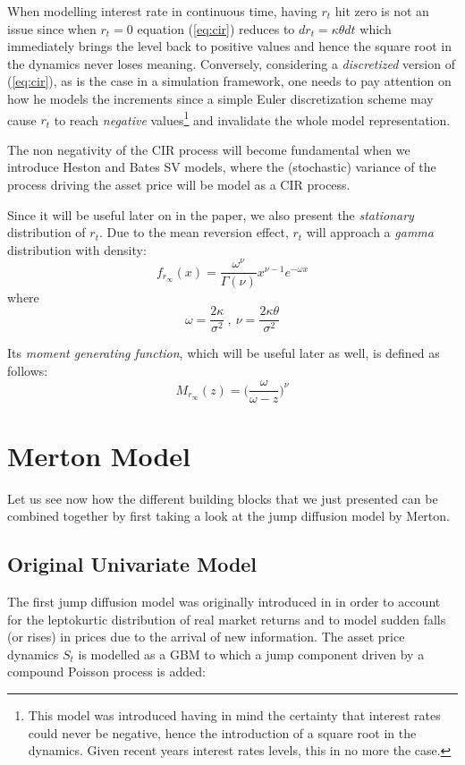 When modelling interest rate in continuous time, having $r_t$ hit zero is not an issue since when $r_t=0$ equation (\ref{eq:cir}) reduces to $dr_t = \kappa\theta dt$ which immediately brings the level back to positive values and hence the square root in the dynamics never loses meaning. Conversely, considering a \textit{discretized} version of (\ref{eq:cir}), as is the case in a simulation framework, one needs to pay attention on how he models the increments since a simple Euler discretization scheme may cause $r_t$ to reach \textit{negative} values\footnote{This model was introduced having in mind the certainty that interest rates could never be negative, hence the introduction of a square root in the dynamics. Given recent years interest rates levels, this in no more the case.} and invalidate the whole model representation.

The non negativity of the CIR process will become fundamental when we introduce Heston and Bates SV models, where the (stochastic) variance of the process driving the asset price will be model as a CIR process.

Since it will be useful later on in the paper, we also present the \textit{stationary} distribution of $r_t$. Due to the mean reversion effect, $r_t$ will approach a \textit{gamma} distribution with density:
\begin{equation}
\label{eq:cir_pdf}
f_{r_\infty}(x) = \frac{\omega^\nu}{\Gamma(\nu)} x^{\nu-1}e^{-\omega x}
\end{equation}
where
\begin{equation*}
\omega= \frac{2\kappa}{\sigma^2}\: , \: \nu= \frac{2\kappa\theta}{\sigma^2}
\end{equation*}

Its \textit{moment generating function}, which will be useful later as well, is defined as follows:
\begin{equation}
\label{eq:cir_mgf}
	M_{r_\infty}(z) = \Big(\frac{\omega}{\omega-z}\Big)^\nu
\end{equation}

\bigskip
\section{Merton Model}
\label{sec:merton}
Let us see now how the different building blocks that we just presented can be combined together by first taking a look at the jump diffusion model by Merton.

\subsection{Original Univariate Model}
The first jump diffusion model was originally introduced in \citep{MERTON1976} in order to account for the leptokurtic distribution of real market returns and to model sudden falls (or rises) in prices due to the arrival of new information.
The asset price dynamics $S_t$ is modelled as a GBM to which a jump component driven by a compound Poisson process is added:

